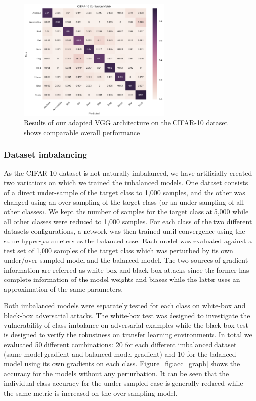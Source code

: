\documentclass[runningheads,a4paper]{llncs}
\begin{document}
\begin{figure}
	\centering
	\includegraphics[height=6.0cm]{conf_matrix.png}
	\caption{Results of our adapted VGG architecture on the CIFAR-10 dataset shows comparable overall performance}
	\label{fig:conf_matrix_full}
\end{figure}

\subsubsection{Dataset imbalancing} As the CIFAR-10 dataset is not naturally imbalanced, we have artificially created two variations on which we trained the imbalanced models.  One dataset consists of a direct under-sample of the target class to 1,000 samples, and the other was changed using  an over-sampling of the target class (or an under-sampling of all other classes). We kept the number of samples for the target class at 5,000 while all other classes were reduced to 1,000 samples. For each class of the two different datasets configurations, a network was then trained until convergence using the same hyper-parameters as the balanced case. Each model was evaluated against a test set of 1,000 samples of the target class which was  perturbed by its own under/over-sampled model and the balanced model. The two sources of gradient information are referred as white-box and black-box attacks since the former has complete information of the model weights and biases while the latter uses an approximation of the same parameters. 

Both imbalanced models were separately tested for each class on white-box and black-box adversarial attacks. The white-box test was designed to investigate the vulnerability of class imbalance on adversarial examples while the black-box test is designed to verify the robustness on transfer learning environments. In total we evaluated 50 different combinations: 20 for each different imbalanced dataset (same model gradient and balanced model gradient) and 10 for the balanced model using its own gradients on each class. Figure~\ref{fig:acc_graph} shows the accuracy for the models without any perturbation. It can be seen that the individual class accuracy for the under-sampled case is generally reduced while the same metric is increased on the over-sampling model. 
\end{document}
